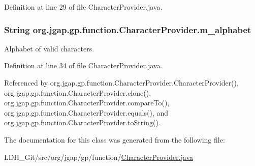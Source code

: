 Definition at line 29 of file Character\-Provider.\-java.

\hypertarget{classorg_1_1jgap_1_1gp_1_1function_1_1_character_provider_aeac5dd7525dfff4d0bcf89857cd53dd0}{
\subsubsection[{m\-\_\-alphabet}]{\setlength{\rightskip}{0pt plus 5cm}String org.\-jgap.\-gp.\-function.\-Character\-Provider.\-m\-\_\-alphabet\hspace{0.3cm}{\ttfamily [private]}}}\label{classorg_1_1jgap_1_1gp_1_1function_1_1_character_provider_aeac5dd7525dfff4d0bcf89857cd53dd0}
Alphabet of valid characters. 

Definition at line 34 of file Character\-Provider.\-java.



Referenced by org.\-jgap.\-gp.\-function.\-Character\-Provider.\-Character\-Provider(), org.\-jgap.\-gp.\-function.\-Character\-Provider.\-clone(), org.\-jgap.\-gp.\-function.\-Character\-Provider.\-compare\-To(), org.\-jgap.\-gp.\-function.\-Character\-Provider.\-equals(), and org.\-jgap.\-gp.\-function.\-Character\-Provider.\-to\-String().



The documentation for this class was generated from the following file\-:\begin{DoxyCompactItemize}
\item 
L\-D\-H\-\_\-\-Git/src/org/jgap/gp/function/\hyperlink{_character_provider_8java}{Character\-Provider.\-java}\end{DoxyCompactItemize}
